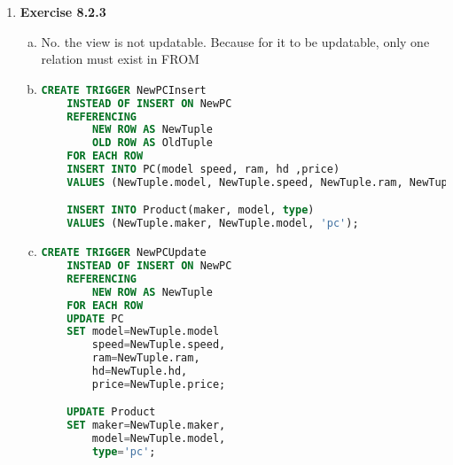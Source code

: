 \documentclass[12pt]{article}
\begin{document}
\begin{enumerate}[1.]
    \item \textbf{Exercise 8.2.3}

    \bigskip

    \begin{enumerate}[a)]
        \item No. the view is not updatable. Because for it to be updatable,
        only one relation must exist in FROM
        \item

    \begin{lstlisting}[language=SQL]
    CREATE TRIGGER NewPCInsert
    INSTEAD OF INSERT ON NewPC
    REFERENCING
        NEW ROW AS NewTuple
        OLD ROW AS OldTuple
    FOR EACH ROW
    INSERT INTO PC(model speed, ram, hd ,price)
    VALUES (NewTuple.model, NewTuple.speed, NewTuple.ram, NewTuple.hd, NewTuple.price);

    INSERT INTO Product(maker, model, type)
    VALUES (NewTuple.maker, NewTuple.model, 'pc');
    \end{lstlisting}

        \item

    \begin{lstlisting}[language=SQL]
    CREATE TRIGGER NewPCUpdate
    INSTEAD OF INSERT ON NewPC
    REFERENCING
        NEW ROW AS NewTuple
    FOR EACH ROW
    UPDATE PC
    SET model=NewTuple.model
        speed=NewTuple.speed,
        ram=NewTuple.ram,
        hd=NewTuple.hd,
        price=NewTuple.price;

    UPDATE Product
    SET maker=NewTuple.maker,
        model=NewTuple.model,
        type='pc';
    \end{lstlisting}



    \end{enumerate}

\end{enumerate}
\end{document}
